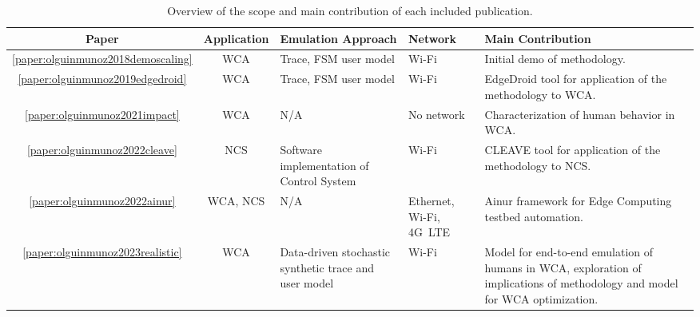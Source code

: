 \begin{table}[]
    \centering
    \caption{Overview of the scope and main contribution of each included publication.}\label{tab:scope}
    \tiny
    \renewcommand{\arraystretch}{1.5}
    \begin{tabularx}{\textwidth}{@{}ccXYX@{}}
        \toprule
        \textbf{Paper} & \textbf{Application} & \textbf{Emulation Approach} & \textbf{Network} & \textbf{Main Contribution}                                \\ \midrule
        \ref{paper:olguinmunoz2018demoscaling} & \acs{WCA} & Trace, \acs{FSM} user model & Wi-Fi & Initial demo of methodology. \\
        \ref{paper:olguinmunoz2019edgedroid} & \acs{WCA} & Trace, \acs{FSM} user model & Wi-Fi & EdgeDroid tool for application of the methodology to \acs{WCA}. \\
        \ref{paper:olguinmunoz2021impact} & \acs{WCA} & \acs{N/A} & No network & Characterization of human behavior in \acs{WCA}. \\
        \ref{paper:olguinmunoz2022cleave} & \acs{NCS} & Software implementation of Control System & Wi-Fi & \acs{CLEAVE} tool for application of the methodology to \acs{NCS}. \\
        \ref{paper:olguinmunoz2022ainur} & \acs{WCA}, \acs{NCS} & \acs{N/A} & Ethernet, Wi-Fi, 4G~\acs{LTE} & Ainur framework for Edge Computing testbed automation. \\
        \ref{paper:olguinmunoz2023realistic} &
        \acs{WCA} &
        Data-driven stochastic synthetic trace and user model &
        Wi-Fi &
        Model for end-to-end emulation of humans in \acs{WCA}, exploration of implications of methodology and model for \acs{WCA} optimization. \\
        \bottomrule
    \end{tabularx}
\end{table}